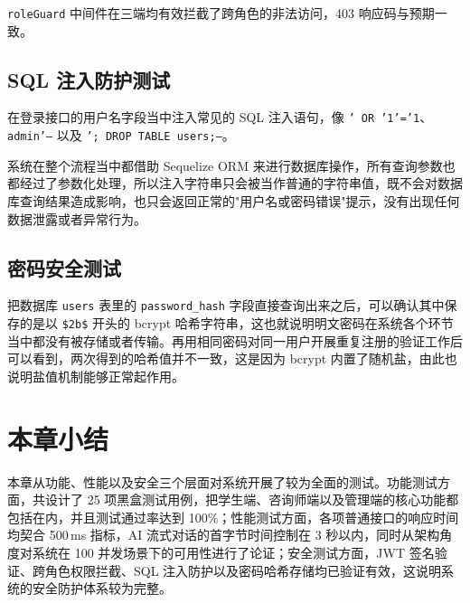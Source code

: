 \texttt{roleGuard} 中间件在三端均有效拦截了跨角色的非法访问，403 响应码与预期一致。

\subsection{SQL 注入防护测试}

在登录接口的用户名字段当中注入常见的 SQL 注入语句，像 \texttt{' OR '1'='1}、\texttt{admin'--} 以及 \texttt{'; DROP TABLE users;--}。

系统在整个流程当中都借助 Sequelize ORM 来进行数据库操作，所有查询参数也都经过了参数化处理，所以注入字符串只会被当作普通的字符串值，既不会对数据库查询结果造成影响，也只会返回正常的"用户名或密码错误"提示，没有出现任何数据泄露或者异常行为。

\subsection{密码安全测试}

把数据库 \texttt{users} 表里的 \texttt{password\_hash} 字段直接查询出来之后，可以确认其中保存的是以 \texttt{\$2b\$} 开头的 bcrypt 哈希字符串，这也就说明明文密码在系统各个环节当中都没有被存储或者传输。再用相同密码对同一用户开展重复注册的验证工作后可以看到，两次得到的哈希值并不一致，这是因为 bcrypt 内置了随机盐，由此也说明盐值机制能够正常起作用\cite{provos1999}。

\section*{本章小结}

本章从功能、性能以及安全三个层面对系统开展了较为全面的测试。功能测试方面，共设计了 25 项黑盒测试用例，把学生端、咨询师端以及管理端的核心功能都包括在内，并且测试通过率达到 100\%；性能测试方面，各项普通接口的响应时间均契合 500\,ms 指标，AI 流式对话的首字节时间控制在 3 秒以内，同时从架构角度对系统在 100 并发场景下的可用性进行了论证；安全测试方面，JWT 签名验证、跨角色权限拦截、SQL 注入防护以及密码哈希存储均已验证有效，这说明系统的安全防护体系较为完整。

